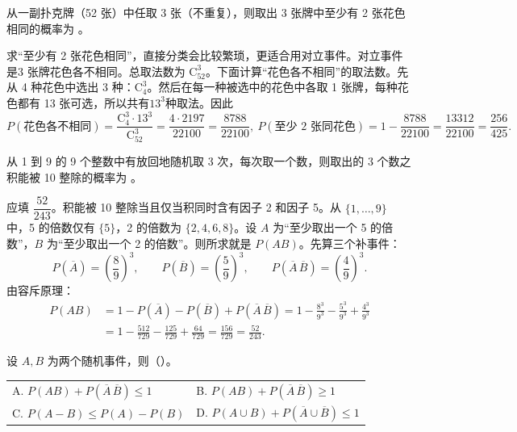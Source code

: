 \documentclass[lang=cn,11pt]{elegantbook}
\begin{document}
\begin{exercise}\label{exer:1-26}
从一副扑克牌（52 张）中任取 3 张（不重复），则取出 3 张牌中至少有 2 张花色相同的概率为 \underline{\hspace{2cm}}。
\end{exercise}

\begin{solution}
求“至少有 2 张花色相同”，直接分类会比较繁琐，更适合用对立事件。对立事件是\(\text{3 张牌花色各不相同}\)。总取法数为 \(\mathrm C_{52}^{3}\)。下面计算“花色各不相同”的取法数。先从 4 种花色中选出 3 种：\(\mathrm C_4^3\)。然后在每一种被选中的花色中各取 1 张牌，每种花色都有 13 张可选，所以共有\(13^3\)种取法。因此
\[
P(\text{花色各不相同})
=\frac{\mathrm C_4^3\cdot 13^3}{\mathrm C_{52}^{3}}
=\frac{4\cdot 2197}{22100}
=\frac{8788}{22100},~
P(\text{至少 2 张同花色})
=1-\frac{8788}{22100}
=\frac{13312}{22100}
=\frac{256}{425}.
\]
\end{solution}


\begin{exercise}[提高]\label{exer:1-51}
从 1 到 9 的 9 个整数中有放回地随机取 3 次，每次取一个数，则取出的 3 个数之积能被 10 整除的概率为 \underline{\hspace{2cm}}。
\end{exercise}

\begin{solution}
应填 \(\dfrac{52}{243}\)。积能被 10 整除当且仅当积同时含有因子 2 和因子 5。从 \(\{1,\dots,9\}\) 中，5 的倍数仅有 \(\{5\}\)，2 的倍数为 \(\{2,4,6,8\}\)。设 \(A\) 为“至少取出一个 5 的倍数”，\(B\) 为“至少取出一个 2 的倍数”。则所求就是 \(P(AB)\)。先算三个补事件：\[
P(\overline A)=\left(\frac89\right)^3,\qquad P(\overline B)=\left(\frac59\right)^3,\qquad P(\overline A\,\overline B)=\left(\frac49\right)^3.
\]
由容斥原理：
\begin{align*}
P(AB) &= 1 - P(\overline{A}) - P(\overline{B}) + P(\overline{A}\,\overline{B}) = 1 - \frac{8^3}{9^3} - \frac{5^3}{9^3} + \frac{4^3}{9^3} \\
&= 1 - \frac{512}{729} - \frac{125}{729} + \frac{64}{729} = \frac{156}{729} = \frac{52}{243}.
\end{align*}
\end{solution}


\begin{exercise}\label{exer:1-9}
设 \(A, B\) 为两个随机事件，则（\quad）。\\
\begin{tabular}{ll}
A. \(P(AB)+P(\overline{A}\,\overline{B})\le 1\) & B. \(P(AB)+P(\overline{A}\,\overline{B})\ge 1\) \\
C. \(P(A-B)\le P(A)-P(B)\) & D. \(P(A\cup B)+P(\overline{A}\cup\overline{B})\le 1\)
\end{tabular}
\end{exercise}
\end{document}

